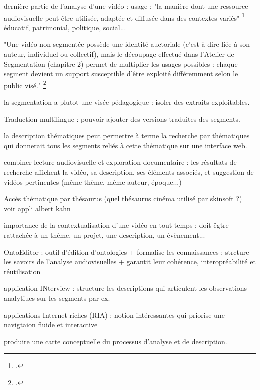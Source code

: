 dernière partie de l'analyse d'une vidéo : usage :
"la manière dont une ressource audiovisuelle peut être utilisée, adaptée et diffusée dans des contextes variés" \footcite{stockinger2011}
éducatif, patrimonial, politique, social...

"Une vidéo non segmentée possède une identité auctoriale (c’est-à-dire liée à son auteur, individuel ou collectif), mais le découpage effectué dans l’Atelier de Segmentation (chapitre 2) permet de multiplier les usages possibles : chaque segment devient un support susceptible d’être exploité différemment selon le public visé." \footcite{stockinger2011}

la segmentation a plutot une visée pédagogique : isoler des extraits exploitables. 

Traduction multilingue : pouvoir ajouter des versions traduites des segments. 

la description thématiques peut permettre à terme la recherche par thématiques qui donnerait tous les segments reliés à cette thématique sur une interface web. 

combiner lecture audiovisuelle et exploration documentaire : les résultats de recherche affichent la vidéo, sa description, ses éléments associés, et suggestion de vidéos pertinentes (même thème, même auteur, époque...)

Accès thématique par thésaurus (quel thésaurus cinéma utilisé par skinsoft ?) voir appli albert kahn 

importance de la contextualisation d'une vidéo en tout temps : doit êgtre rattachée à un thème, un projet, une description, un évènement... 

OntoEditor : outil d'édition d'ontologies + formalise les connaissances : strcture les savoirs de l'analyse audiovisuelles + garantit leur cohérence, interopréabilité et réutilisation

application INterview : structure les descriptions qui articulent les observations analytiues sur les segments par ex. 

applications Internet riches (RIA) : notion intéressantes qui priorise une navigtaion fluide et interactive 

produire une carte conceptuelle du processus d'analyse et de description. 